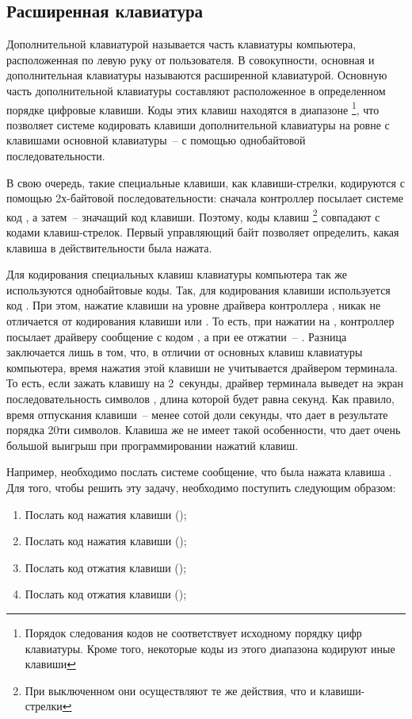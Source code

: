 \subsection{Расширенная клавиатура}
Дополнительной клавиатурой называется часть клавиатуры компьютера, расположенная
по левую руку от пользователя. В совокупности, основная и дополнительная клавиатуры называются
расширенной клавиатурой. Основную часть дополнительной клавиатуры составляют
расположенное в определенном порядке цифровые клавиши. Коды этих клавиш находятся в диапазоне
\footnote{Порядок следования кодов не соответствует исходному порядку цифр клавиатуры.
	Кроме того, некоторые коды из этого диапазона кодируют иные клавиши}, что позволяет системе
кодировать клавиши дополнительной клавиатуры на ровне с клавишами основной клавиатуры~-- с помощью
однобайтовой последовательности. 
\newpar

В свою очередь, такие специальные клавиши, как клавиши-стрелки, кодируются с помощью 2х-байтовой последовательности:
сначала контроллер посылает системе код , а затем~-- значащий код клавиши. Поэтому, коды клавиш 
\footnote{При выключенном  они осуществляют те же действия, что и клавиши-стрелки} 
совпадают с кодами клавиш-стрелок. Первый управляющий байт позволяет определить, какая клавиша в 
действительности была нажата.
\newpar

Для кодирования специальных клавиш клавиатуры компьютера так же используются однобайтовые коды.
Так, для кодирования клавиши  используется код . При этом, нажатие клавиши
 на уровне драйвера контроллера , никак не отличается от кодирования клавиши 
или . То есть, при нажатии на , контроллер посылает драйверу сообщение с кодом ,
а при ее отжатии~-- . Разница заключается лишь в том, что, в отличии от основных клавиш клавиатуры компьютера,
время нажатия этой клавиши не учитывается драйвером терминала. То есть, если зажать клавишу  на 2~секунды,
драйвер терминала выведет на экран последовательность символов , длина которой будет равна
 секунд. Как правило, время отпускания клавиши~-- менее сотой доли секунды,
что дает в результате порядка 20ти символов. Клавиша  же не имеет такой особенности, что дает
очень большой выигрыш при программировании нажатий клавиш.
\newpar

Например, необходимо послать системе сообщение, что была нажата клавиша .
Для того, чтобы решить эту задачу, необходимо поступить следующим образом:
\begin{enumerate}
	\item Послать код нажатия клавиши  ();
	\item Послать код нажатия клавиши  ();
	\item Послать код отжатия клавиши  ();
	\item Послать код отжатия клавиши  ();
\end{enumerate}
\newpar

